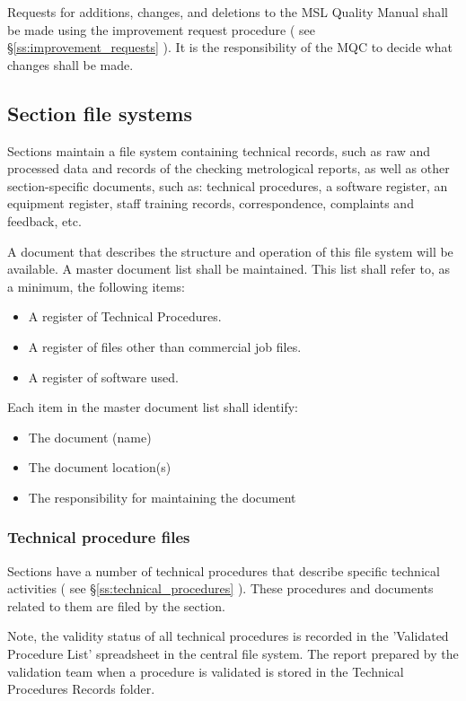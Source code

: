 Requests for additions, changes, and deletions to the MSL Quality Manual shall be made using the improvement request procedure ( see \S\ref{ss:improvement_requests} ).
It is the responsibility of the MQC to decide what changes shall be made.

\subsection{Section file systems}
\label{ss:section_file_systems}
Sections maintain a file system containing technical records, such as raw and processed data and records of the checking metrological reports, as well as other section-specific documents, such as: technical procedures, a software register, an equipment register, staff training records, correspondence, complaints and feedback, etc. 

A document that describes the structure and operation of this file system will be available. A master document list shall be maintained. This list shall refer to, as a minimum, the following items: 
\begin{itemize}
\item A register of Technical Procedures. 
\item A register of files other than commercial job files. 
\item A register of software used. 
\end{itemize}
Each item in the master document list shall identify:
\begin{itemize}
\item The document (name) 
\item The document location(s) 
\item The responsibility for maintaining the document
\end{itemize}

\subsubsection{Technical procedure files}
Sections have a number of technical procedures that describe specific technical activities ( see \S\ref{ss:technical_procedures} ). These procedures and documents related to them are filed by the section.
 
Note, the validity status of all technical procedures is recorded in the 'Validated Procedure List' spreadsheet in the central file system. The report prepared by the validation team when a procedure is validated is stored in the Technical Procedures Records folder.

